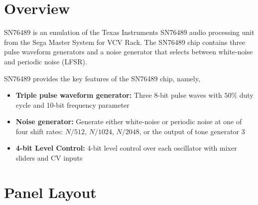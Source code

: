 \documentclass[12pt,letter]{article}
\begin{document}


\section{Overview}

SN76489 is an emulation of the Texas Instruments SN76489 audio processing unit from the Sega Master System for VCV Rack. The SN76489 chip contains three pulse waveform generators and a noise generator that selects between white-noise and periodic noise (LFSR).

SN76489 provides the key features of the SN76489 chip, namely,
\begin{itemize}
  \item \textbf{Triple pulse waveform generator:} Three 8-bit pulse waves with $50\%$ duty cycle and 10-bit frequency parameter
  \item \textbf{Noise generator:} Generate either white-noise or periodic noise at one of four shift rates: $N/512$, $N/1024$, $N/2048$, or the output of tone generator 3
  \item \textbf{4-bit Level Control:} 4-bit level control over each oscillator with mixer sliders and CV inputs
\end{itemize}


\clearpage
\section{Panel Layout}
\end{document}
